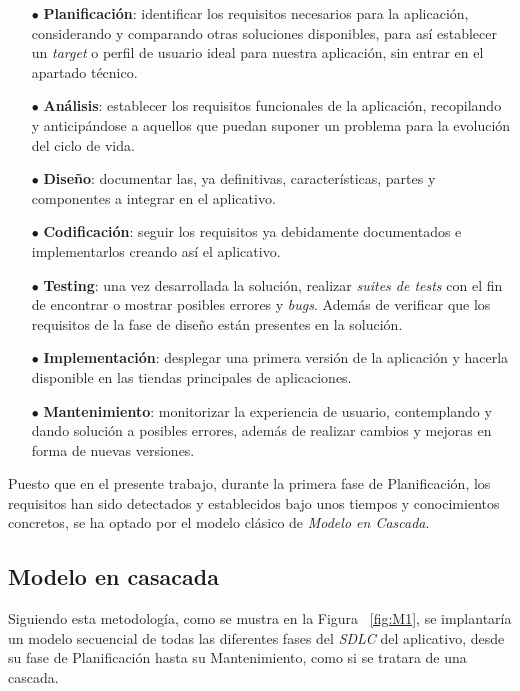 \documentclass[11pt,spanish,listoffigures,listoftables]{tfgetsinf}
\begin{document}
\begin{itemize}
   \item[$\bullet$] \textbf{Planificación}: identificar los requisitos necesarios para la aplicación,
   considerando y comparando otras soluciones disponibles, para así establecer un \textit{target} o perfil de usuario ideal
   para nuestra aplicación, sin entrar en el apartado técnico.
   \item[$\bullet$] \textbf{Análisis}: establecer los requisitos funcionales de la aplicación, recopilando 
   y anticipándose a aquellos que puedan suponer un problema para la evolución del ciclo de vida.
   \item[$\bullet$] \textbf{Diseño}: documentar las, ya definitivas, características, partes y componentes a integrar en el aplicativo.
   \item[$\bullet$] \textbf{Codificación}: seguir los requisitos ya debidamente documentados e implementarlos creando así el aplicativo. 
   \item[$\bullet$] \textbf{Testing}: una vez desarrollada la solución, realizar \textit{suites de tests} con el fin de encontrar o mostrar
   posibles errores y \textit{bugs}. Además de verificar que los requisitos de la fase de diseño están presentes en la solución.  
   \item[$\bullet$] \textbf{Implementación}: desplegar una primera versión de la aplicación y hacerla disponible en las tiendas principales
   de aplicaciones. 
   \item[$\bullet$] \textbf{Mantenimiento}: monitorizar la experiencia de usuario, contemplando y dando solución a posibles errores,
   además de realizar cambios y mejoras en forma de nuevas versiones.
\end{itemize}

Puesto que en el presente trabajo, durante la primera fase de Planificación, los requisitos han sido detectados y establecidos bajo unos tiempos 
y conocimientos concretos, se ha optado por el modelo clásico de \textit{Modelo en Cascada}.

\subsection{Modelo en casacada} %

Siguiendo esta metodología, como se mustra en la Figura ~\ref{fig:M1}, se implantaría un modelo secuencial de todas las diferentes fases del 
\textit{SDLC} del aplicativo, 
desde su fase de Planificación hasta su Mantenimiento, como si se tratara de una cascada.
\end{document}
